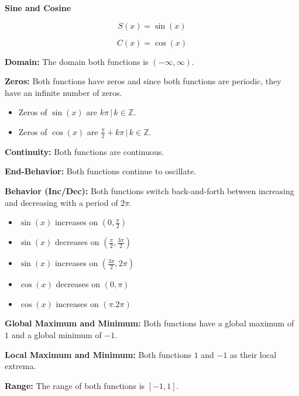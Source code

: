 \documentclass{ximera}
\begin{document}
\begin{explanation} \textbf{\textcolor{red!75!green}{Sine and Cosine}} 


\[ S(x) = \sin(x)  \]

\[ C(x) = \cos(x)  \]



\textbf{Domain:} The domain both functions is $(-\infty, \infty)$.

\textbf{Zeros:} Both functions have zeros and since both functions are periodic, they have an infinite number of zeros.


\begin{itemize}
\item Zeros of $\sin(x)$ are ${k \pi \, | \, k \in \mathbb{Z}}$.
\item Zeros of $\cos(x)$ are ${\frac{\pi}{2} + k \pi\, | \, k \in \mathbb{Z}}$.
\end{itemize}


\textbf{Continuity:} Both functions are continuous.



\textbf{End-Behavior:} Both functions continue to oscillate.






\textbf{Behavior (Inc/Dec):} Both functions switch back-and-forth between increasing and decreasing with a period of $2\pi$.

\begin{itemize}
\item $\sin(x)$ increases on $\left(0, \frac{\pi}{2} \right)$
\item $\sin(x)$ decreases on $\left(\frac{\pi}{2}, \frac{3\pi}{2} \right)$
\item $\sin(x)$ increases on $\left(\frac{3\pi}{2}, 2\pi \right)$
\end{itemize}

\begin{itemize}
\item $\cos(x)$ decreases on $(0, \pi)$
\item $\cos(x)$ increases on $(\pi. 2\pi)$
\end{itemize}







\textbf{Global Maximum and Minimum:} Both functions have a global maximum of $1$ and a global minimum of $-1$.




\textbf{Local Maximum and Minimum:}  Both functions $1$ and $-1$ as their local extrema.




\textbf{Range:} The range of both functions is $[-1, 1]$.

\end{explanation}
\end{document}
